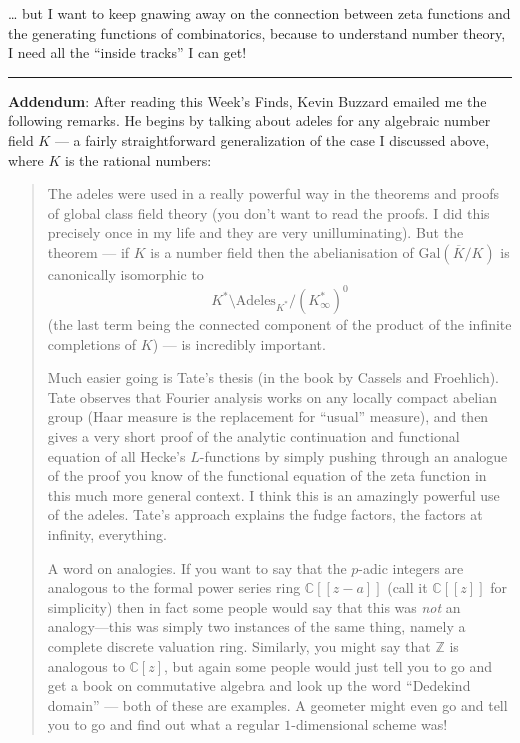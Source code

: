 \documentclass{article}
\begin{document}
\ldots{} but I want to keep gnawing away on the connection between zeta
functions and the generating functions of combinatorics, because to
understand number theory, I need all the ``inside tracks'' I can get!

\begin{center}\rule{0.5\linewidth}{0.5pt}\end{center}

\textbf{Addendum}: After reading this Week's Finds, Kevin Buzzard
emailed me the following remarks. He begins by talking about adeles for
any algebraic number field \(K\) --- a fairly straightforward
generalization of the case I discussed above, where \(K\) is the
rational numbers:

\begin{quote}
The adeles were used in a really powerful way in the theorems and proofs
of global class field theory (you don't want to read the proofs. I did
this precisely once in my life and they are very unilluminating). But
the theorem --- if \(K\) is a number field then the abelianisation of
\(\mathrm{Gal}(\overline{K}/K)\) is canonically isomorphic to
\[K^*\setminus\mathrm{Adeles}_{K^*}/(K_\infty^*)^0\] (the last term
being the connected component of the product of the infinite completions
of \(K\)) --- is incredibly important.

Much easier going is Tate's thesis (in the book by Cassels and
Froehlich). Tate observes that Fourier analysis works on any locally
compact abelian group (Haar measure is the replacement for ``usual''
measure), and then gives a very short proof of the analytic continuation
and functional equation of all Hecke's \(L\)-functions by simply pushing
through an analogue of the proof you know of the functional equation of
the zeta function in this much more general context. I think this is an
amazingly powerful use of the adeles. Tate's approach explains the fudge
factors, the factors at infinity, everything.

A word on analogies. If you want to say that the \(p\)-adic integers are
analogous to the formal power series ring \(\mathbb{C}[[z-a]]\) (call it
\(\mathbb{C}[[z]]\) for simplicity) then in fact some people would say
that this was \emph{not} an analogy---this was simply two instances of
the same thing, namely a complete discrete valuation ring. Similarly,
you might say that \(\mathbb{Z}\) is analogous to \(\mathbb{C}[z]\), but
again some people would just tell you to go and get a book on
commutative algebra and look up the word ``Dedekind domain'' --- both of
these are examples. A geometer might even go and tell you to go and find
out what a regular \(1\)-dimensional scheme was!


\end{quote}
\end{document}
